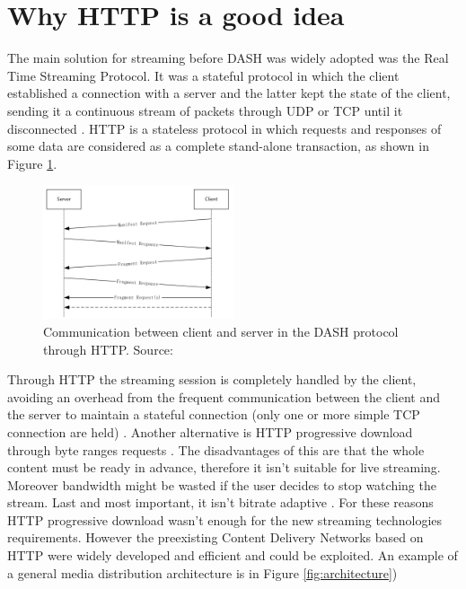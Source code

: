 \documentclass[openany]{book}
\begin{document}
\section{Why HTTP is a good idea}
The main solution for streaming before DASH was widely adopted was the Real Time Streaming Protocol. It was a stateful protocol in which the client established a connection with a server and the latter kept the state of the client, sending it a continuous stream of packets through UDP or TCP until it disconnected \cite{DASH2}. HTTP is a stateless protocol in which requests and responses of some data are considered as a complete stand-alone transaction, as shown in Figure \ref{fig:http}.
\begin{figure}[ht]
\centering
\includegraphics[width=0.5\textwidth]{http.png}
\caption{\label{fig:http}Communication between client and server in the DASH protocol through HTTP. Source: \cite{MS}}
\end{figure}
Through HTTP the streaming session is completely handled by the client, avoiding an overhead from the frequent communication between the client and the server to maintain a stateful connection (only one or more simple TCP connection are held) \cite{DASH2, HTTP}. Another alternative is HTTP progressive download through byte ranges requests \cite{DASH2}. The disadvantages of this are that the whole content must be ready in advance, therefore it isn't suitable for live streaming. Moreover bandwidth might be wasted if the user decides to stop watching the stream. Last and most important, it isn't bitrate adaptive \cite{DASH2}. For these reasons HTTP progressive download wasn't enough for the new streaming technologies requirements. However the preexisting Content Delivery Networks based on HTTP were widely developed and efficient and could be exploited. An example of a general media distribution architecture is in Figure \ref{fig:architecture})
\end{document}
